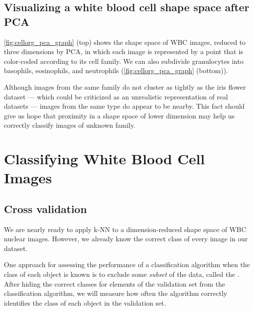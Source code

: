 \begin{note}[%
It can be proven that for any dataset, when $d_1$ is smaller than $d_2$, the hyperplane provided by PCA of dimension $d_1$ is \textit{always} a subset of the hyperplane of dimension $d_2$. For example, the first principal component is always found within the plane ($d = 2$) provided by PCA, as indicated in \autoref{fig:three_dimensional_pca} (left).
]\end{note}

\FloatBarrier
{}
\subsection{Visualizing a white blood cell shape space after PCA}

\autoref{fig:cellorg_pca_graph} (top) shows the shape space of WBC images, reduced to three dimensions by PCA, in which each image is represented by a point that is color-coded according to its cell family. We can also subdivide granulocytes into basophils, eosinophils, and neutrophils (\autoref{fig:cellorg_pca_graph} (bottom)).

Although images from the same family do not cluster as tightly as the iris flower dataset --- which could be criticized as an unrealistic representation of real datasets --- images from the same type do appear to be nearby. This fact should give us hope that proximity in a shape space of lower dimension may help us correctly classify images of unknown family.\\

\FloatBarrier
{}

\section{Classifying White Blood Cell Images}
\label{sec:training}

\subsection{Cross validation}

We are nearly ready to apply k-NN to a dimension-reduced shape space of WBC nuclear images. However, we already know the correct class of every image in our dataset.

One approach for assessing the performance of a classification algorithm when the class of each object is known is to exclude some \textit{subset} of the data, called the . After hiding the correct classes for elements of the validation set from the classification algorithm, we will measure how often the algorithm correctly identifies the class of each object in the validation set.

